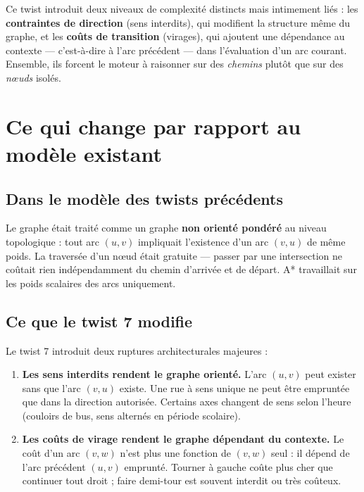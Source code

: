\documentclass[12pt,a4paper]{article}
\theoremstyle{definition}
\theoremstyle{remark}
\begin{document}
Ce twist introduit deux niveaux de complexité distincts mais intimement liés :
les \textbf{contraintes de direction} (sens interdits), qui modifient la
structure même du graphe, et les \textbf{coûts de transition} (virages), qui
ajoutent une dépendance au contexte — c'est-à-dire à l'arc précédent — dans
l'évaluation d'un arc courant. Ensemble, ils forcent le moteur à raisonner
sur des \emph{chemins} plutôt que sur des \emph{nœuds} isolés.

\newpage

\section{Ce qui change par rapport au modèle existant}

\subsection{Dans le modèle des twists précédents}

Le graphe était traité comme un graphe \textbf{non orienté pondéré} au niveau
topologique : tout arc $(u, v)$ impliquait l'existence d'un arc $(v, u)$ de
même poids. La traversée d'un nœud était gratuite — passer par une
intersection ne coûtait rien indépendamment du chemin d'arrivée et de
départ. A* travaillait sur les poids scalaires des arcs uniquement.

\subsection{Ce que le twist 7 modifie}

Le twist 7 introduit deux ruptures architecturales majeures :

\begin{enumerate}[leftmargin=2em, itemsep=6pt]
  \item \textbf{Les sens interdits rendent le graphe orienté.}
    L'arc $(u, v)$ peut exister sans que l'arc $(v, u)$ existe. Une rue
    à sens unique ne peut être empruntée que dans la direction autorisée.
    Certains axes changent de sens selon l'heure (couloirs de bus, sens
    alternés en période scolaire).

  \item \textbf{Les coûts de virage rendent le graphe dépendant du contexte.}
    Le coût d'un arc $(v, w)$ n'est plus une fonction de $(v, w)$ seul :
    il dépend de l'arc précédent $(u, v)$ emprunté. Tourner à gauche
    coûte plus cher que continuer tout droit ; faire demi-tour est
    souvent interdit ou très coûteux.
\end{enumerate}
\end{document}
